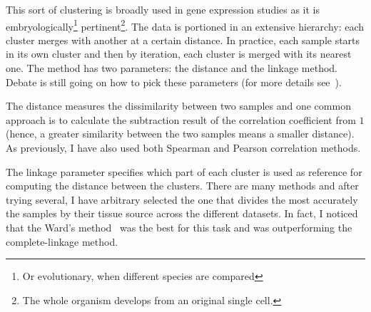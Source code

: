 This sort of clustering is broadly used in gene expression studies as it is
embryologically\footnote{Or evolutionary, when different species are compared}
pertinent\footnote{The whole organism develops from
an original single cell.}. The data is portioned in an extensive hierarchy:
each cluster merges with another at a certain distance.
In practice, each sample starts in its own cluster and then
by iteration, each cluster is merged with its nearest one.
The method has two parameters: the distance and the linkage method.
Debate is still going on how to pick these parameters (for more details
see~).

The distance measures the dissimilarity between two samples and one common
approach is to calculate the subtraction result of
the correlation coefficient from $1$ (hence, a greater similarity between the two
samples means a smaller distance). As previously, I have also used both Spearman
and Pearson correlation methods.

The linkage parameter specifies which part of each cluster is used as reference
for computing the distance between the clusters. There are many methods and after
trying several, I have arbitrary selected the one that divides the most accurately
the samples by their tissue source across the different datasets.
In fact, I noticed that the Ward's method~
was the best for this task and was outperforming the complete-linkage method.

